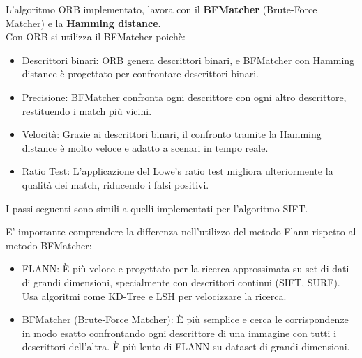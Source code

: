 \documentclass[12pt,a4paper,openright,twoside]{book}
\begin{document}
\begin{enumerate}
\begin{enumerate}
L'algoritmo ORB implementato, lavora con il \textbf{BFMatcher} (Brute-Force Matcher) e la \textbf{Hamming distance}.\\
Con ORB si utilizza il BFMatcher poichè:
\begin{itemize}
\item Descrittori binari: ORB genera descrittori binari, e BFMatcher con Hamming distance è progettato per confrontare descrittori binari.
\item Precisione: BFMatcher confronta ogni descrittore con ogni altro descrittore, restituendo i match più vicini.
\item Velocità: Grazie ai descrittori binari, il confronto tramite la Hamming distance è molto veloce e adatto a scenari in tempo reale.
\item Ratio Test: L'applicazione del Lowe's ratio test migliora ulteriormente la qualità dei match, riducendo i falsi positivi.
\end{itemize}

I passi seguenti sono simili a quelli implementati per l'algoritmo SIFT.
\end{enumerate}

\end{enumerate}
E' importante comprendere la differenza nell'utilizzo del metodo Flann rispetto al metodo BFMatcher:
\begin{itemize}

\item FLANN: È più veloce e progettato per la ricerca approssimata su set di dati di grandi dimensioni, specialmente con descrittori continui (SIFT, SURF). Usa algoritmi come KD-Tree e LSH per velocizzare la ricerca.
\item BFMatcher (Brute-Force Matcher): È più semplice e cerca le corrispondenze in modo esatto confrontando ogni descrittore di una immagine con tutti i descrittori dell'altra. È più lento di FLANN su dataset di grandi dimensioni.

\end{itemize}

\end{document}
